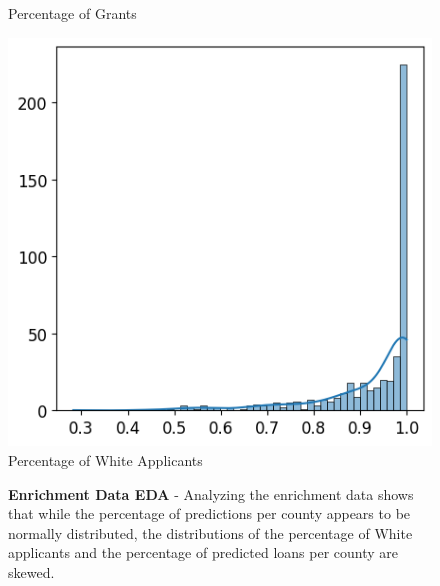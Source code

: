 \begin{figure}[!htbp]
\begin{minipage}{0.33\textwidth}
        \small
        Percentage of Grants
    \end{minipage}\hfill
    \begin{minipage}{0.33\textwidth}
        \centering
        \includegraphics[width=\textwidth]{images/geo_enrich/white_per_county.png}
        \small
        Percentage of White Applicants
    \end{minipage}\hfill
    \caption[Enrichment Data EDA]{\textbf{Enrichment Data EDA} - Analyzing the enrichment data shows that while the percentage of predictions per county appears to be normally distributed, the distributions of the percentage of White applicants and the percentage of predicted loans per county are skewed.}
    \label{fig:Enrichment_Data_EDA}
\end{figure}

\newpage

%

